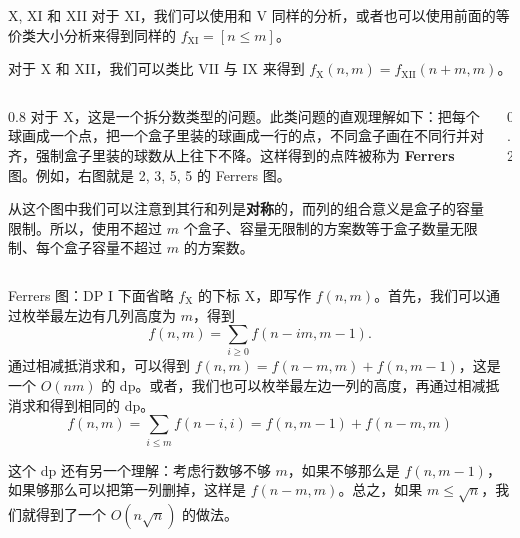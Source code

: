 \begin{frame}{X, XI 和 XII}
    对于 XI，我们可以使用和 V 同样的分析，或者也可以使用前面的等价类大小分析来得到同样的 $f_{\mathrm{XI}}=[n\le m]$。

    对于 X 和 XII，我们可以类比 VII 与 IX 来得到 $f_{\mathrm{X}}(n,m)=f_{\mathrm{XII}}(n+m,m)$。

    \vspace{0.5em}

    \begin{columns}[T, onlytextwidth]

    \begin{column}{0.8\textwidth}
    对于 X，这是一个拆分数类型的问题。此类问题的直观理解如下：把每个球画成一个点，把一个盒子里装的球画成一行的点，不同盒子画在不同行并对齐，强制盒子里装的球数从上往下不降。这样得到的点阵被称为 \textbf{Ferrers} 图。例如，右图就是 2, 3, 5, 5 的 Ferrers 图。

    \vspace{1em}

    从这个图中我们可以注意到其行和列是\textbf{对称}的，而列的组合意义是盒子的容量限制。所以，使用不超过 $m$ 个盒子、容量无限制的方案数等于盒子数量无限制、每个盒子容量不超过 $m$ 的方案数。
    \end{column}

    \begin{column}{0.2\textwidth}
        \vspace{1cm}
    
        \centering


    \end{column}
    \end{columns}
\end{frame}
\begin{frame}{Ferrers 图：DP I}
            下面省略 $f_{\mathrm{X}}$ 的下标 X，即写作 $f(n,m)$。首先，我们可以通过枚举最左边有几列高度为 $m$，得到
            $$
            f(n,m)=\sum_{i\ge 0}f(n-im,m-1).
            $$ 
            通过相减抵消求和，可以得到 $f(n,m)=f(n-m,m)+f(n,m-1)$，这是一个 $O(nm)$ 的 dp。或者，我们也可以枚举最左边一列的高度，再通过相减抵消求和得到相同的 dp。
            $$
            f(n,m)=\sum_{i\le m}f(n-i,i)=f(n,m-1)+f(n-m,m)
            $$

            这个 dp 还有另一个理解：考虑行数够不够 $m$，如果不够那么是 $f(n,m-1)$，如果够那么可以把第一列删掉，这样是 $f(n-m,m)$。总之，如果 $m\le \sqrt{n}$，我们就得到了一个 $O(n\sqrt{n})$ 的做法。
\end{frame}
